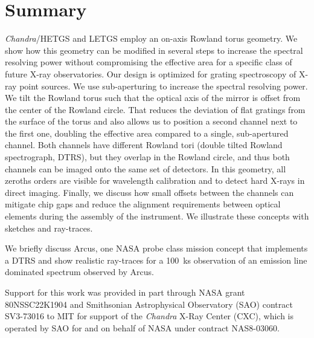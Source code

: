 \documentclass[linenumbers]{aastex631}
\begin{document}
\section{Summary}
\label{sect:summary}
\emph{Chandra}/HETGS and LETGS employ an on-axis Rowland torus geometry. We show how this geometry can be modified in several steps to increase the spectral resolving power without compromising the effective area for a specific class of future X-ray observatories. Our design is optimized for grating spectroscopy of X-ray point sources. We use sub-aperturing to increase the spectral resolving power. We tilt the Rowland torus such that the optical axis of the mirror is offset from the center of the Rowland circle. That reduces the deviation of flat gratings from the surface of the torus and also allows us to position a second channel next to the first one, doubling the effective area compared to a single, sub-apertured channel. Both channels have different Rowland tori (double tilted Rowland spectrograph, DTRS), but they overlap in the Rowland circle, and thus both channels can be imaged onto the same set of detectors. In this geometry, all zeroths orders are visible for wavelength calibration and to detect hard X-rays in direct imaging. Finally, we discuss how small offsets between the channels can mitigate chip gaps and reduce the alignment requirements between optical elements during the assembly of the instrument. We illustrate these concepts with sketches and ray-traces.

We briefly discuss Arcus, one NASA probe class mission concept that implements a DTRS and show realistic ray-traces for a 100~ks observation of an emission line dominated spectrum observed by Arcus.


\begin{acknowledgements}
Support for this work was provided in part through NASA grant 80NSSC22K1904 and Smithsonian Astrophysical Observatory (SAO)
contract SV3-73016 to MIT for support of the {\em Chandra} X-Ray Center (CXC),
which is operated by SAO for and on behalf of NASA under contract NAS8-03060.
\end{acknowledgements}


{}



\end{document}
